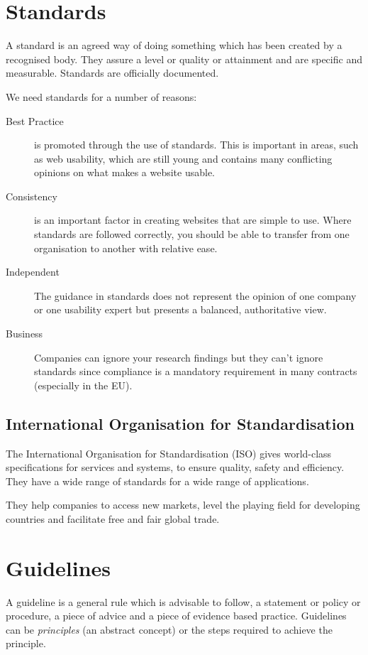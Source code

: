 
\section*{Standards}
A standard is an agreed way of doing something which has been created by a recognised body. They assure a level or quality or attainment and are specific and measurable. Standards are officially documented. 

We need standards for a number of reasons:
\begin{description}
    \item[Best Practice] is promoted through the use of standards. This is important in areas, such as web usability, which are still young  and contains many conflicting opinions on what makes a website usable.
    \item[Consistency] is an important factor in creating websites that are simple to use. Where standards are followed correctly, you should be able to transfer from one organisation to another with relative ease.
    \item[Independent] The guidance in standards does not represent the opinion of one company or one usability expert but presents a balanced, authoritative view. 
    \item[Business] Companies can ignore your research findings but they can't ignore standards since compliance is a mandatory requirement in many contracts (especially in the EU).
\end{description}

\subsection*{International Organisation for Standardisation}
The International Organisation for Standardisation (ISO) gives world-class specifications for services and systems, to ensure quality, safety and efficiency. They have a wide range of standards for a wide range of applications.

They help companies to access new markets, level the playing field for developing countries and facilitate free and fair global trade. 

\section*{Guidelines}
A guideline is a general rule which is advisable to follow, a statement or policy or procedure, a piece of advice and a piece of evidence based practice. Guidelines can be \textit{principles} (an abstract concept) or the steps required to achieve the principle.

